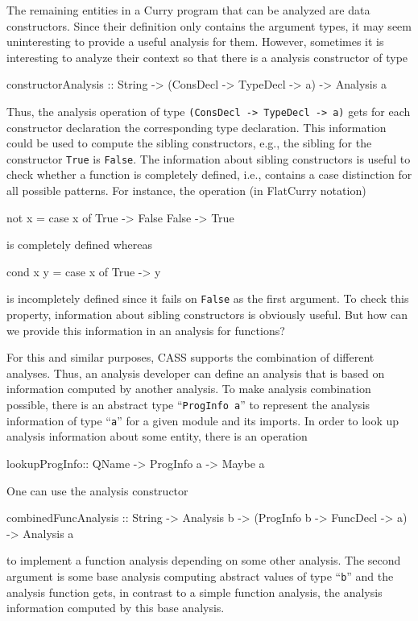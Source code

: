 \documentclass{llncs}
\newcommand{\code}[1]{\mbox{\small\texttt{#1}}}
\newcommand{\ccode}[1]{``\code{#1}''}
\begin{document}
The remaining entities in a Curry program that can be analyzed
are data constructors. Since their definition only contains the
argument types, it may seem uninteresting to provide a useful
analysis for them. However, sometimes it is interesting
to analyze their context so that there is a analysis constructor
of type
\begin{curry}
constructorAnalysis :: String -> (ConsDecl -> TypeDecl -> a)
                    -> Analysis a
\end{curry}
Thus, the analysis operation of type \code{(ConsDecl -> TypeDecl -> a)}
gets for each constructor declaration the corresponding type declaration.
This information could be used to compute the sibling constructors, e.g.,
the sibling for the constructor \code{True} is \code{False}.
The information about sibling constructors is useful to check
whether a function is completely defined, i.e., contains
a case distinction for all possible patterns.
For instance, the operation (in FlatCurry notation)
\begin{curry}
not x = case x of True  -> False
                  False -> True
\end{curry}
is completely defined whereas
\begin{curry}
cond x y = case x of True -> y
\end{curry}
is incompletely defined since it fails on \code{False} as the first
argument.
To check this property, information about sibling constructors
is obviously useful.
But how can we provide this information in an analysis for functions?

For this and similar purposes, CASS supports the
combination of different analyses.
Thus, an analysis developer can define an analysis
that is based on information computed by another analysis.
To make analysis combination possible,
there is an abstract type \ccode{ProgInfo a}
to represent the analysis information of type \ccode{a}
for a given module and its imports.
In order to look up analysis information about some entity, there is
an operation
\begin{curry}
lookupProgInfo:: QName -> ProgInfo a -> Maybe a
\end{curry}
One can use the analysis constructor
\begin{curry}
combinedFuncAnalysis :: String -> Analysis b
                  -> (ProgInfo  b -> FuncDecl -> a) -> Analysis a
\end{curry}
to implement a function analysis depending on some other analysis.
The second argument is some base analysis computing abstract values
of type \ccode{b} and the analysis function gets, in contrast to a simple
function analysis, the analysis information computed by this base
analysis.
\end{document}
